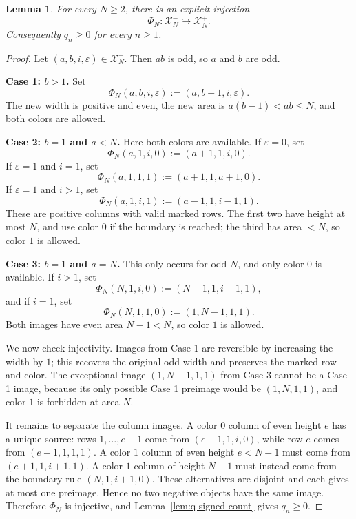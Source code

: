 \documentclass[11pt]{article}
\newtheorem{lemma}{Lemma}
\newcommand{\calX}{\mathcal{X}}
\begin{document}
\begin{lemma}\label{lem:injection}
For every $N\geq2$, there is an explicit injection
\[
  \Phi_N:\calX_N^-\hookrightarrow\calX_N^+.
\]
Consequently $q_n\geq0$ for every $n\geq1$.
\end{lemma}

\begin{proof}
Let $(a,b,i,\varepsilon)\in\calX_N^-$.  Then $ab$ is odd, so $a$ and $b$ are odd.

\medskip
\noindent\textbf{Case 1: $b>1$.}
Set
\[
  \Phi_N(a,b,i,\varepsilon):=(a,b-1,i,\varepsilon).
\]
The new width is positive and even, the new area is $a(b-1)<ab\leq N$, and both colors are allowed.

\medskip
\noindent\textbf{Case 2: $b=1$ and $a<N$.}
Here both colors are available.  If $\varepsilon=0$, set
\[
  \Phi_N(a,1,i,0):=(a+1,1,i,0).
\]
If $\varepsilon=1$ and $i=1$, set
\[
  \Phi_N(a,1,1,1):=(a+1,1,a+1,0).
\]
If $\varepsilon=1$ and $i>1$, set
\[
  \Phi_N(a,1,i,1):=(a-1,1,i-1,1).
\]
These are positive columns with valid marked rows.  The first two have height at most $N$, and use color $0$ if the boundary is reached; the third has area $<N$, so color $1$ is allowed.

\medskip
\noindent\textbf{Case 3: $b=1$ and $a=N$.}
This only occurs for odd $N$, and only color $0$ is available.  If $i>1$, set
\[
  \Phi_N(N,1,i,0):=(N-1,1,i-1,1),
\]
and if $i=1$, set
\[
  \Phi_N(N,1,1,0):=(1,N-1,1,1).
\]
Both images have even area $N-1<N$, so color $1$ is allowed.

We now check injectivity.  Images from Case 1 are reversible by increasing the width by $1$; this recovers the original odd width and preserves the marked row and color.  The exceptional image $(1,N-1,1,1)$ from Case 3 cannot be a Case 1 image, because its only possible Case 1 preimage would be $(1,N,1,1)$, and color $1$ is forbidden at area $N$.

It remains to separate the column images.  A color $0$ column of even height $e$ has a unique source: rows $1,\ldots,e-1$ come from $(e-1,1,i,0)$, while row $e$ comes from $(e-1,1,1,1)$.  A color $1$ column of even height $e<N-1$ must come from $(e+1,1,i+1,1)$.  A color $1$ column of height $N-1$ must instead come from the boundary rule $(N,1,i+1,0)$.  These alternatives are disjoint and each gives at most one preimage.  Hence no two negative objects have the same image.  Therefore $\Phi_N$ is injective, and Lemma~\ref{lem:q-signed-count} gives $q_n\geq0$.
\end{proof}
\end{document}

